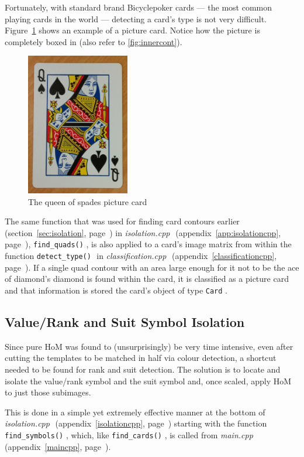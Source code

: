 \documentclass[a4paper,12pt,notitlepage]{article}
\newcommand{\source}[2]{\emph{#1 } (appendix~\ref{#2}, page~\pageref{#2})}
\newcommand{\secref}[1]{(section~\ref{#1}, page~\pageref{#1})}
\newcommand{\code}[1]{\colorbox{white}{\lstinline[basicstyle=\ttfamily\color{black}]|#1|} }
\begin{document}
		Fortunately, with standard brand Bicycle\textregistered poker cards --- the most common playing cards in the world --- detecting a card's type is not very difficult. Figure~\ref{fig:picture} shows an example of a picture card. Notice how the picture is completely boxed in (also refer to \ref{fig:innercont}).

		\begin{figure}[H]
			\centering
			\includegraphics[width=0.4\textwidth]{picture}
			\caption{The queen of spades picture card}
			\label{fig:picture}
		\end{figure}

		The same function that was used for finding card contours earlier \secref{sec:isolation} in \source{isolation.cpp}{app:isolationcpp}, \code{find_quads()}, is also applied to a card's image matrix from within the function \code{detect_type()} in \source{classification.cpp}{classificationcpp}. If a single quad contour with an area large enough for it not to be the ace of diamond's diamond is found within the card, it is classified as a picture card and that information is stored the card's object of type \code{Card}.
	\subsection{Value/Rank and Suit Symbol Isolation}
		Since pure HoM was found to (unsurprisingly) be very time intensive, even after cutting the templates to be matched in half via colour detection, a shortcut needed to be found for rank and suit detection. The solution is to locate and isolate the value/rank symbol and the suit symbol and, once scaled, apply HoM to just those subimages.

		This is done in a simple yet extremely effective manner at the bottom of \source{isolation.cpp}{isolationcpp} starting with the function \code{find_symbols()}, which, like \code{find_cards()}, is called from \source{main.cpp}{maincpp}.
\end{document}

